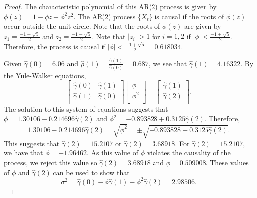 \documentclass[12pt]{article}
\theoremstyle{definition}
\begin{document}
\begin{proof}
  The characteristic polynomial of this AR(2) process is given by $\phi(z) = 1 - \phi z - \phi^2 z^2$.
  The AR(2) process $\{X_t\}$ is causal if the roots of $\phi(z)$ occur outside the unit circle.
  Note that the roots of $\phi(z)$ are given by $z_1 = \frac{-1 + \sqrt{5}}{2}$
  and $z_2 = \frac{-1 - \sqrt{5}}{2}$. Note that $|z_i| > 1$ for $i=1,2$ if
  $|\phi| < \frac{-1 + \sqrt{5}}{2}$. Therefore, the process is causal if
  $|\phi| < \frac{-1 + \sqrt{5}}{2} = 0.618034$.

  Given $\hat{\gamma}(0) = 6.06$ and $\hat{\rho}(1) = \frac{\hat{\gamma}(1)}{\hat{\gamma}(0)} = 0.687$,
  we see that $\hat{\gamma}(1) = 4.16322$. By the Yule-Walker equations,
  \[
    \begin{bmatrix}
      \hat{\gamma}(0) & \hat{\gamma}(1) \\
      \hat{\gamma}(1) & \hat{\gamma}(0) \\
    \end{bmatrix}
    \begin{bmatrix}
      \phi \\
      \phi^2 \\
    \end{bmatrix}
    =
    \begin{bmatrix}
      \hat{\gamma}(1) \\
      \hat{\gamma}(2) \\
    \end{bmatrix}.
  \]
  The solution to this system of equations suggests that
  $\phi = 1.30106 - 0.214696 \hat{\gamma}(2)$ and $\phi^2 = -0.893828 + 0.3125\hat{\gamma}(2)$.
  Therefore,
  \[
    1.30106 - 0.214696 \hat{\gamma}(2) = \sqrt{\phi^2} = \pm \sqrt{-0.893828 + 0.3125\hat{\gamma}(2)}.
  \]
  This suggests that $\hat{\gamma}(2) = 15.2107$ or $\hat{\gamma}(2) = 3.68918$. For $\hat{\gamma}(2) = 15.2107$,
  we have that $\phi = -1.96462$. As this value of $\phi$ violates the causality of the process,
  we reject this value so $\hat{\gamma}(2) = 3.68918$ and $\phi = 0.509008$. These values of
  $\phi$ and $\hat{\gamma}(2)$ can be used to show that
  \[
    \sigma^2 = \hat{\gamma}(0) - \phi \hat{\gamma}(1) - \phi^2 \hat{\gamma}(2) = 2.98506.
  \]
\end{proof}
\end{document}
